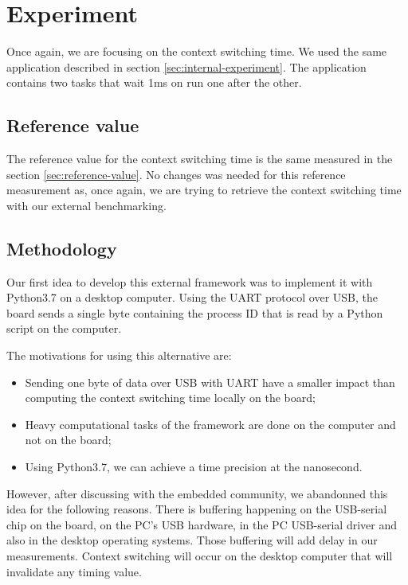 \section{Experiment}

Once again, we are focusing on the context switching time.
We used the same application described in section \ref{sec:internal-experiment}.
The application contains two tasks that wait 1ms on run one after the other.

\subsection{Reference value}

The reference value for the context switching time is the same measured in the section \ref{sec:reference-value}.
No changes was needed for this reference measurement as, once again, we are trying to retrieve the context switching time with our external benchmarking.

\subsection{Methodology}

Our first idea to develop this external framework was to implement it with Python3.7 on a desktop computer.
Using the UART protocol over USB, the board sends a single byte containing the process ID that is read by a Python script on the computer.

The motivations for using this alternative are:
\begin{itemize}
  \item Sending one byte of data over USB with UART have a smaller impact than computing the context switching time locally on the board;
  \item Heavy computational tasks of the framework are done on the computer and not on the board;
  \item Using Python3.7, we can achieve a time precision at the nanosecond.
\end{itemize}

However, after discussing with the embedded community, we abandonned this idea for the following reasons.
There is buffering happening on the USB-serial chip on the board, on the PC's USB hardware, in the PC USB-serial driver and also in the desktop operating systems.
Those buffering will add delay in our measurements.
Context switching will occur on the desktop computer that will invalidate any timing value.

